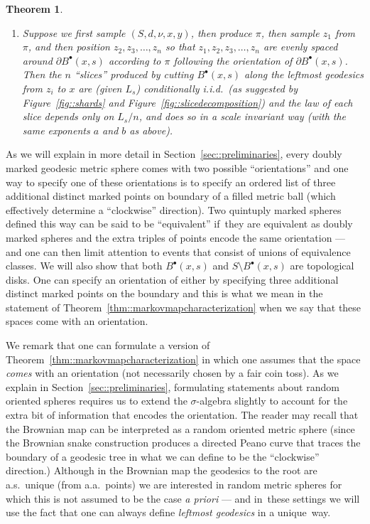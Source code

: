 \documentclass[10pt]{amsart}
\newcommand{\sbullet}{{\scriptscriptstyle\bullet}}
\theoremstyle{plain}
\newtheorem{theorem}{Theorem}
\numberwithin{theorem}{section}
\theoremstyle{definition}
\newcommand{\fb}[2]{B^\sbullet(#1,#2)}
\begin{document}
\begin{theorem}
\begin{enumerate}
\begin{enumerate}
\begin{enumerate}
\item Suppose we first sample $(S,d,\nu,x,y)$, then produce $\pi$, then sample $z_1$ from $\pi$, and then position $z_2, z_3, \ldots, z_n$ so that $z_1, z_2, z_3, \ldots, z_n$ are evenly spaced around $\partial \fb{x}{s}$ according to $\pi$ following the orientation of $\partial \fb{x}{s}$. Then the $n$ ``slices'' produced by cutting $\fb{x}{s}$ along the leftmost geodesics from $z_i$ to $x$ are (given $L_s$) conditionally i.i.d.\ (as suggested by Figure~\ref{fig::shards} and Figure~\ref{fig::slicedecomposition}) and the law of each slice depends only on $L_s/n$, and does so in a scale invariant way (with the same exponents $a$ and $b$ as above).
\end{enumerate}
\end{enumerate}
\end{enumerate}
\end{theorem}


As we will explain in more detail in Section~\ref{sec::preliminaries}, every doubly marked geodesic metric sphere comes with two possible ``orientations'' and one way to specify one of these orientations is to specify an ordered list of three additional distinct marked points on boundary of a filled metric ball (which effectively determine a ``clockwise'' direction). Two quintuply marked spheres defined this way can be said to be ``equivalent'' if~they are equivalent as doubly marked spheres and the extra triples of points encode the same orientation --- and one can then limit attention to events that consist of unions of equivalence classes. We will also show that both $\fb{x}{s}$ and $S \setminus \fb{x}{s}$ are topological disks. One can specify an orientation of either by specifying three additional distinct marked points on the boundary and this is what we mean in the statement of Theorem~\ref{thm::markovmapcharacterization} when we say that these spaces come with an orientation.

We remark that one can formulate a version of Theorem~\ref{thm::markovmapcharacterization} in which one assumes that the space \emph{comes} with an orientation (not necessarily chosen by a fair coin toss). As we explain in Section~\ref{sec::preliminaries}, formulating statements about random oriented spheres requires us to extend the $\sigma$-algebra slightly to account for the extra bit of information that encodes the orientation. The reader may recall that the Brownian map can be interpreted as a random oriented metric sphere (since the Brownian snake construction produces a directed Peano curve that traces the boundary of a geodesic tree in what we can define to be the ``clockwise'' direction.) Although in the Brownian map the geodesics to the root are a.s.\ unique (from a.a.\ points) we are interested in random metric spheres for which this is not assumed to be the case \emph{a priori} --- and in~these settings we will use the fact that one can always define \emph{leftmost geodesics} in a unique~way.
\end{document}
